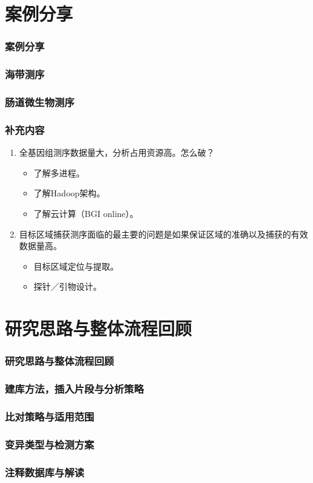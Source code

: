 \documentclass[12pt]{beamer}
\begin{document}
\section{案例分享}
\begin{frame}\frametitle{案例分享}
  \end{frame}

\begin{frame}\frametitle{海带测序}
 \end{frame}

\begin{frame}\frametitle{肠道微生物测序}
 \end{frame}

\begin{frame}\frametitle{补充内容}
  \begin{enumerate}
  \item 全基因组测序数据量大，分析占用资源高。怎么破？
    \begin{itemize}
      \item 了解多进程。
      \item 了解Hadoop架构。
      \item 了解云计算（BGI online）。
    \end{itemize}
  \item 目标区域捕获测序面临的最主要的问题是如果保证区域的准确以及捕获的有效数据量高。
    \begin{itemize}
    \item 目标区域定位与提取。
    \item 探针／引物设计。
    \end{itemize}
  \end{enumerate}
\end{frame}

\section{研究思路与整体流程回顾}
\begin{frame}\frametitle{研究思路与整体流程回顾}
\end{frame}
\begin{frame}\frametitle{建库方法，插入片段与分析策略}
\end{frame}

\begin{frame}\frametitle{比对策略与适用范围}
\end{frame}

\begin{frame}\frametitle{变异类型与检测方案}
\end{frame}

\begin{frame}\frametitle{注释数据库与解读}
\end{frame}

\begin{frame}
  \end{frame}
\end{document}
